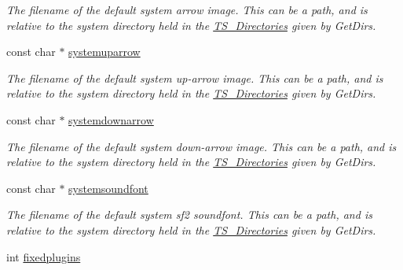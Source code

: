 \begin{DoxyCompactItemize}
\begin{DoxyCompactList}\small\item\em The filename of the default system arrow image. This can be a path, and is relative to the system directory held in the \hyperlink{structTS__Directories}{T\-S\-\_\-\-Directories} given by Get\-Dirs. \end{DoxyCompactList}\item 
\hypertarget{structTS__Config_abfe131ca697d11f736dd16833aeab564}{const char $\ast$ \hyperlink{structTS__Config_abfe131ca697d11f736dd16833aeab564}{systemuparrow}}\label{structTS__Config_abfe131ca697d11f736dd16833aeab564}

\begin{DoxyCompactList}\small\item\em The filename of the default system up-\/arrow image. This can be a path, and is relative to the system directory held in the \hyperlink{structTS__Directories}{T\-S\-\_\-\-Directories} given by Get\-Dirs. \end{DoxyCompactList}\item 
\hypertarget{structTS__Config_a97a6d1fa4d41ddcf6b8eb98ffb290116}{const char $\ast$ \hyperlink{structTS__Config_a97a6d1fa4d41ddcf6b8eb98ffb290116}{systemdownarrow}}\label{structTS__Config_a97a6d1fa4d41ddcf6b8eb98ffb290116}

\begin{DoxyCompactList}\small\item\em The filename of the default system down-\/arrow image. This can be a path, and is relative to the system directory held in the \hyperlink{structTS__Directories}{T\-S\-\_\-\-Directories} given by Get\-Dirs. \end{DoxyCompactList}\item 
\hypertarget{structTS__Config_a1799a6bb967c31b384b1733600740ac4}{const char $\ast$ \hyperlink{structTS__Config_a1799a6bb967c31b384b1733600740ac4}{systemsoundfont}}\label{structTS__Config_a1799a6bb967c31b384b1733600740ac4}

\begin{DoxyCompactList}\small\item\em The filename of the default system sf2 soundfont. This can be a path, and is relative to the system directory held in the \hyperlink{structTS__Directories}{T\-S\-\_\-\-Directories} given by Get\-Dirs. \end{DoxyCompactList}\item 
\hypertarget{structTS__Config_a27b50c3bb3aa431e80516f8e76840cad}{int \hyperlink{structTS__Config_a27b50c3bb3aa431e80516f8e76840cad}{fixedplugins}}\label{structTS__Config_a27b50c3bb3aa431e80516f8e76840cad}


\end{DoxyCompactItemize}
